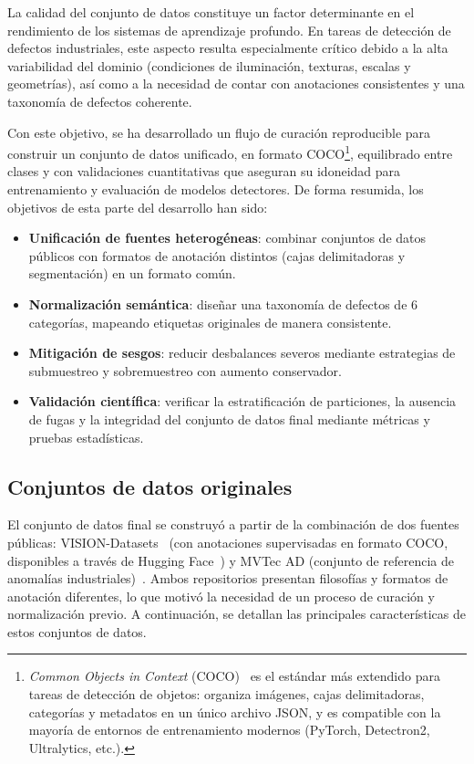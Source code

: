 La calidad del conjunto de datos constituye un factor determinante en el rendimiento de los sistemas de aprendizaje profundo. En tareas de detección de defectos industriales, este aspecto resulta especialmente crítico debido a la alta variabilidad del dominio (condiciones de iluminación, texturas, escalas y geometrías), así como a la necesidad de contar con anotaciones consistentes y una taxonomía de defectos coherente.

Con este objetivo, se ha desarrollado un flujo de curación reproducible para construir un conjunto de datos unificado, en formato COCO\footnote{\textit{Common Objects in Context} (COCO)~\cite{lin2014coco} es el estándar más extendido para tareas de detección de objetos: organiza imágenes, cajas delimitadoras, categorías y metadatos en un único archivo JSON, y es compatible con la mayoría de entornos de entrenamiento modernos (PyTorch, Detectron2, Ultralytics, etc.).}, equilibrado entre clases y con validaciones cuantitativas que aseguran su idoneidad para entrenamiento y evaluación de modelos detectores. De forma resumida, los objetivos de esta parte del desarrollo han sido:

\begin{itemize}
    \item \textbf{Unificación de fuentes heterogéneas}: combinar conjuntos de datos públicos con formatos de anotación distintos (cajas delimitadoras y segmentación) en un formato común.
    \item \textbf{Normalización semántica}: diseñar una taxonomía de defectos de 6 categorías, mapeando etiquetas originales de manera consistente.
    \item \textbf{Mitigación de sesgos}: reducir desbalances severos mediante estrategias de submuestreo y sobremuestreo con aumento conservador.
    \item \textbf{Validación científica}: verificar la estratificación de particiones, la ausencia de fugas y la integridad del conjunto de datos final mediante métricas y pruebas estadísticas.
\end{itemize}

\subsection{Conjuntos de datos originales}

El conjunto de datos final se construyó a partir de la combinación de dos fuentes públicas: VISION-Datasets~\cite{bai2023visiondatasets} (con anotaciones supervisadas en formato COCO, disponibles a través de Hugging Face~\cite{visiondatasets_huggingface}) y MVTec AD (conjunto de referencia de anomalías industriales)~\cite{bergmann2019mvtec}. Ambos repositorios presentan filosofías y formatos de anotación diferentes, lo que motivó la necesidad de un proceso de curación y normalización previo. A continuación, se detallan las principales características de estos conjuntos de datos.


